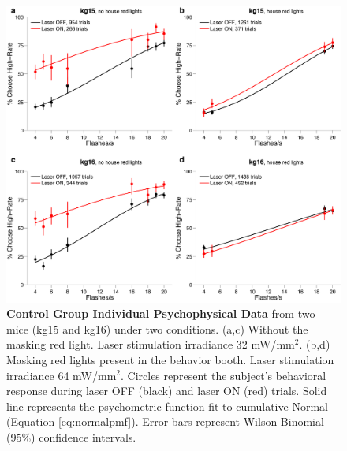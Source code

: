 \begin{figure}
  \centering
   \includegraphics[width=\textwidth]{Figures/chapter4/jaws_controls_individualPMFs.png}
  \caption[Control Group Individual Psychophysical Data ]{\textbf{Control Group Individual Psychophysical Data} from two mice (kg15 and kg16) under two conditions. (a,c) Without the masking red light. Laser stimulation irradiance 32 mW/mm$^{2}$. (b,d) Masking red lights present in the behavior booth. Laser stimulation irradiance 64 mW/mm$^{2}$. Circles represent the subject's behavioral response during laser OFF (black) and laser ON (red) trials. Solid line represents the psychometric function fit to cumulative Normal (Equation \ref{eq:normalpmf}). Error bars represent Wilson Binomial (95\%) confidence intervals. }
   \label{fig:ctrlindividual}
\end{figure}
